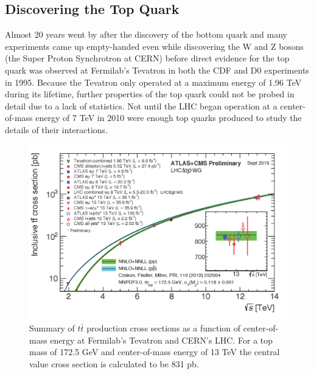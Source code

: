 \subsection{Discovering the Top Quark}

Almost 20 years went by after the discovery of the bottom quark and many experiments came up empty-handed even while discovering the W and Z bosons (the Super Proton Synchrotron at CERN) before direct evidence for the top quark was observed at Fermilab's Tevatron in both the CDF and D0 experiments in 1995\cite{TopObs,TopObsD0}.  Because the Tevatron only operated at a maximum energy of 1.96 TeV during its lifetime, further properties of the top quark could not be probed in detail due to a lack of statistics.  Not until the LHC began operation at a center-of-mass energy of 7 TeV in 2010 were enough top quarks produced to study the details of their interactions. 
\begin{figure}[h!]
	\centering
	\includegraphics[width=\columnwidth]{../ThesisImages/Theory/ttprodxsec.png}
	\caption[Summary of $t\bar{t}$ production cross sections as a function of center-of-mass energy at Fermilab's Tevatron and CERN's LHC.]{Summary of $t\bar{t}$ production cross sections as a function of center-of-mass energy at Fermilab's Tevatron and CERN's LHC.  For a top mass of 172.5 GeV and center-of-mass energy of 13 TeV the central value cross section is calculated to be 831 pb\cite{TopWG}. }
	\label{fig:ttbarXSec}
\end{figure}

